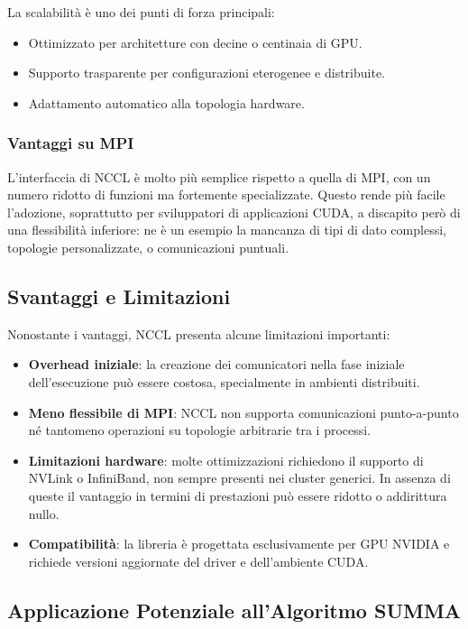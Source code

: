 \documentclass[a4paper]{article}
\begin{document}
La scalabilità è uno dei punti di forza principali:

\begin{itemize}
  \item Ottimizzato per architetture con decine o centinaia di GPU.
  \item Supporto trasparente per configurazioni eterogenee e distribuite.
  \item Adattamento automatico alla topologia hardware.
\end{itemize}

\subsubsection{Vantaggi su MPI}

L'interfaccia di NCCL è molto più semplice rispetto a quella di MPI, con un numero ridotto di funzioni ma fortemente specializzate. Questo rende più facile l’adozione, soprattutto per sviluppatori di applicazioni CUDA, a discapito però di una flessibilità inferiore: ne è un esempio la mancanza di tipi di dato complessi, topologie personalizzate, o comunicazioni puntuali.

\subsection{Svantaggi e Limitazioni}

Nonostante i vantaggi, NCCL presenta alcune limitazioni importanti:

\begin{itemize}
  \item \textbf{Overhead iniziale}: la creazione dei comunicatori nella fase iniziale dell'esecuzione può essere costosa, specialmente in ambienti distribuiti.
  \item \textbf{Meno flessibile di MPI}: NCCL non supporta comunicazioni punto-a-punto né tantomeno operazioni su topologie arbitrarie tra i processi.
  \item \textbf{Limitazioni hardware}: molte ottimizzazioni richiedono il supporto di NVLink o InfiniBand, non sempre presenti nei cluster generici. In assenza di queste il vantaggio in termini di prestazioni può essere ridotto o addirittura nullo.
  \item \textbf{Compatibilità}: la libreria è progettata esclusivamente per GPU NVIDIA e richiede versioni aggiornate del driver e dell’ambiente CUDA.
\end{itemize}

\subsection{Applicazione Potenziale all’Algoritmo SUMMA}
\end{document}

